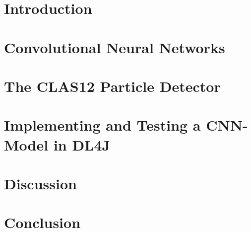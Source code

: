 \documentclass[a4paper, english]{scrreprt}
\begin{document}


\onehalfspacing


\setcounter{tocdepth}{3}
\setcounter{secnumdepth}{3}
\tableofcontents

\chapter{Introduction}



\chapter{Convolutional Neural Networks}

\chapter{The CLAS12 Particle Detector}

\chapter{Implementing and Testing a CNN-Model in DL4J}

\chapter{Discussion}

\chapter{Conclusion}

\printbibliography

\listoffigures
\end{document}
